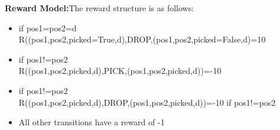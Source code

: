 \documentclass{article}
\begin{document}
\begin{enumerate}[a)]
\textbf{Reward Model:}The reward structure is as follows:
\begin{itemize}
    \item if pos1=pos2=d\\
    R((pos1,pos2,picked=True,d),DROP,(pos1,pos2,picked=False,d)=10
    \item if pos1!=pos2\\
    R((pos1,pos2,picked,d),PICK,(pos1,pos2,picked,d))=-10
    \item if pos1!=pos2\\
    R((pos1,pos2,picked,d),DROP,(pos1,pos2,picked,d))=-10 if pos1!=pos2 
    \item All other transitions have a reward of -1
\end{itemize}
\end{enumerate}
\end{document}
